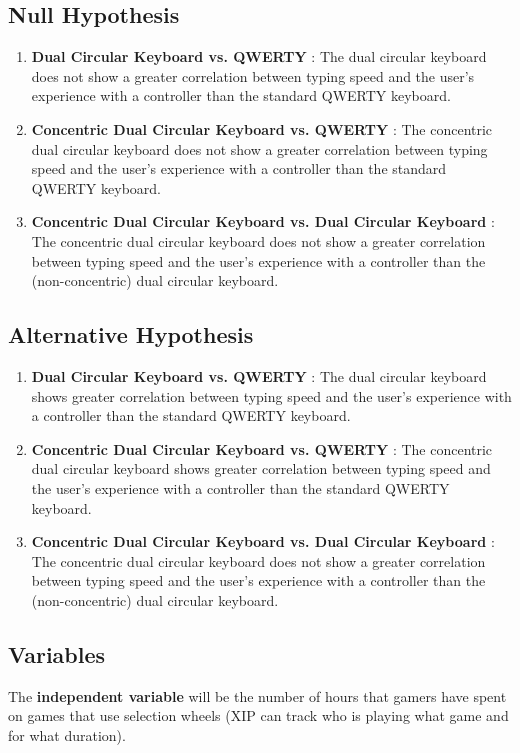 \documentclass[
	letterpaper, %
]{jdf}
\begin{document}
\subsection{Null Hypothesis}
\begin{enumerate}
    \item \textbf{Dual Circular Keyboard vs. QWERTY} : The dual circular keyboard does not show a greater correlation between typing speed and the user's experience with a controller than the standard QWERTY keyboard.
    \item \textbf{Concentric Dual Circular Keyboard vs. QWERTY} : The concentric dual circular keyboard does not show a greater correlation between typing speed and the user's experience with a controller than the standard QWERTY keyboard.
    \item \textbf{Concentric Dual Circular Keyboard vs. Dual Circular Keyboard} : The concentric dual circular keyboard does not show a greater correlation between typing speed and  the user's experience with a controller than the (non-concentric) dual circular keyboard.
\end{enumerate}

\subsection{Alternative Hypothesis}
\begin{enumerate}
    \item \textbf{Dual Circular Keyboard vs. QWERTY} : The dual circular keyboard shows greater correlation between typing speed and  the user's experience with a controller than the standard QWERTY keyboard.
    \item \textbf{Concentric Dual Circular Keyboard vs. QWERTY} : The concentric dual circular keyboard shows greater correlation between typing speed and  the user's experience with a controller than the standard QWERTY keyboard.
    \item \textbf{Concentric Dual Circular Keyboard vs. Dual Circular Keyboard} : The concentric dual circular keyboard does not show a greater correlation between typing speed and  the user's experience with a controller than the (non-concentric) dual circular keyboard.
\end{enumerate}

\subsection{Variables}
The \textbf{independent variable} will be the number of hours that gamers have spent on games that use selection wheels (XIP can track who is playing what game and for what duration). 
\end{document}
